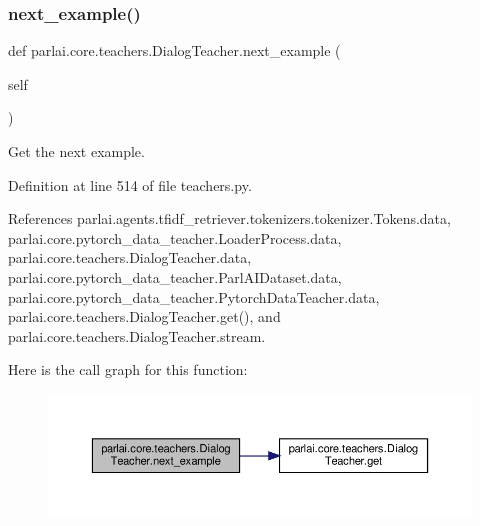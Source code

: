 \subsubsection{\texorpdfstring{next\+\_\+example()}{next\_example()}}
{\footnotesize\ttfamily def parlai.\+core.\+teachers.\+Dialog\+Teacher.\+next\+\_\+example (\begin{DoxyParamCaption}\item[{}]{self }\end{DoxyParamCaption})}

\begin{DoxyVerb}Get the next example.\end{DoxyVerb}
 

Definition at line 514 of file teachers.\+py.



References parlai.\+agents.\+tfidf\+\_\+retriever.\+tokenizers.\+tokenizer.\+Tokens.\+data, parlai.\+core.\+pytorch\+\_\+data\+\_\+teacher.\+Loader\+Process.\+data, parlai.\+core.\+teachers.\+Dialog\+Teacher.\+data, parlai.\+core.\+pytorch\+\_\+data\+\_\+teacher.\+Parl\+A\+I\+Dataset.\+data, parlai.\+core.\+pytorch\+\_\+data\+\_\+teacher.\+Pytorch\+Data\+Teacher.\+data, parlai.\+core.\+teachers.\+Dialog\+Teacher.\+get(), and parlai.\+core.\+teachers.\+Dialog\+Teacher.\+stream.

Here is the call graph for this function\+:
\nopagebreak
\begin{figure}[H]
\begin{center}
\leavevmode
\includegraphics[width=350pt]{classparlai_1_1core_1_1teachers_1_1DialogTeacher_a738c4571db2fee7ce3ab01072f10ed49_cgraph}
\end{center}
\end{figure}
\mbox{\label{classparlai_1_1core_1_1teachers_1_1DialogTeacher_af1e90a07058dc489c45280f0982e21be}} 
